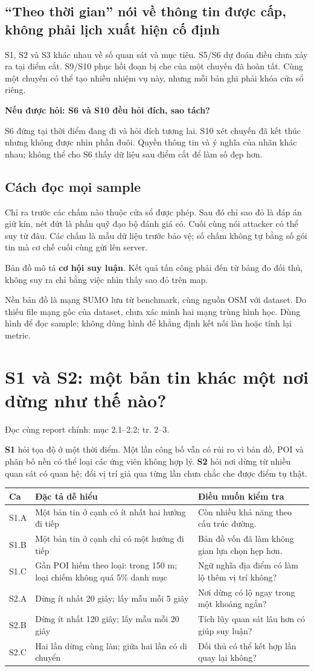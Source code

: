 \documentclass[10pt,a4paper]{article}
\newcommand{\key}[1]{\par\smallskip\noindent\colorbox{pale}{\parbox{\dimexpr\linewidth-2\fboxsep}{#1}}\par\smallskip}
\newcommand{\ask}[2]{\par\textbf{Nếu được hỏi: #1}\par #2\par}
\newcommand{\where}[1]{\par{\small\color{gray}Đọc cùng report chính: #1.}\par}
\newcommand{\guidepage}[1]{\clearpage\section{#1}}
\begin{document}
\subsection*{``Theo thời gian'' nói về thông tin được cấp, không phải lịch xuất hiện cố định}
S1, S2 và S3 khác nhau về số quan sát và mục tiêu. S5/S6 dự đoán điều chưa xảy ra tại điểm cắt. S9/S10 phục hồi đoạn bị che của một chuyến đã hoàn tất. Cùng một chuyến có thể tạo nhiều nhiệm vụ này, nhưng mỗi bản ghi phải khóa cửa sổ riêng.

\ask{S6 và S10 đều hỏi đích, sao tách?}{S6 đứng tại thời điểm đang đi và hỏi đích tương lai. S10 xét chuyến đã kết thúc nhưng không được nhìn phần đuôi. Quyền thông tin và ý nghĩa của nhãn khác nhau; không thể cho S6 thấy dữ liệu sau điểm cắt để làm số đẹp hơn.}

\subsection*{Cách đọc mọi sample}
Chỉ ra trước các chấm nào thuộc cửa sổ được phép. Sau đó chỉ sao đỏ là đáp án giữ kín, nét đứt là phần quỹ đạo bộ đánh giá có. Cuối cùng nói attacker có thể suy từ đâu. Các chấm là mẫu dữ liệu trước bảo vệ; số chấm không tự bằng số gói tin mà cơ chế cuối cùng gửi lên server.
\key{Bản đồ mô tả \textbf{cơ hội suy luận}. Kết quả tấn công phải đến từ bảng đo đối thủ, không suy ra chỉ bằng việc nhìn thấy sao đỏ trên map.}
Nền bản đồ là mạng SUMO lưu từ benchmark, cùng nguồn OSM với dataset. Do thiếu file mạng gốc của dataset, chưa xác minh hai mạng trùng hình học. Dùng hình để đọc sample; không dùng hình để khẳng định kết nối làn hoặc tính lại metric.

\guidepage{S1 và S2: một bản tin khác một nơi dừng như thế nào?}
\where{mục 2.1--2.2; tr. 2--3}
\textbf{S1} hỏi tọa độ ở một thời điểm. Một lần công bố vẫn có rủi ro vì bản đồ, POI và phân bố nền có thể loại các ứng viên không hợp lý. \textbf{S2} hỏi nơi dừng từ nhiều quan sát có quan hệ; đổi vị trí giả qua từng lần chưa chắc che được điểm tụ thật.

\begin{longtable}{@{}P{1.7cm}P{7.7cm}P{6.8cm}@{}}
\toprule Ca & Đặc tả dễ hiểu & Điều muốn kiểm tra\\\midrule
S1.A & Một bản tin ở cạnh có ít nhất hai hướng đi tiếp & Còn nhiều khả năng theo cấu trúc đường.\\[3pt]
S1.B & Một bản tin ở cạnh chỉ có một hướng đi tiếp & Bản đồ vốn đã làm không gian lựa chọn hẹp hơn.\\[3pt]
S1.C & Gần POI hiếm theo loại: trong 150 m; loại chiếm không quá 5\% danh mục & Ngữ nghĩa địa điểm có làm lộ thêm vị trí không?\\[3pt]
S2.A & Dừng ít nhất 20 giây; lấy mẫu mỗi 5 giây & Nơi dừng có lộ ngay trong một khoảng ngắn?\\[3pt]
S2.B & Dừng ít nhất 120 giây; lấy mẫu mỗi 20 giây & Tích lũy quan sát lâu hơn có giúp suy luận?\\[3pt]
S2.C & Hai lần dừng cùng làn; giữa hai lần có di chuyển & Đối thủ có thể kết hợp lần quay lại không?\\
\bottomrule
\end{longtable}
\end{document}
